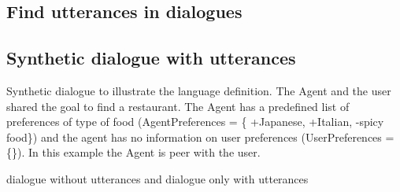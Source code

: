 \documentclass{llncs}
\begin{document}
 \subsection{Find utterances in dialogues}	
 \subsection{Synthetic dialogue with utterances}
 Synthetic dialogue to illustrate the language definition. The Agent and the user shared the goal to find a restaurant. The Agent has a predefined list of preferences of type of food (AgentPreferences = \{ +Japanese, +Italian, -spicy food\}) and the agent has no information on user preferences (UserPreferences = \{\}). In this example the Agent is peer with the user. 
 
 
 dialogue without utterances and dialogue only with utterances


\noindent 
\vskip 4pt


\end{document}
